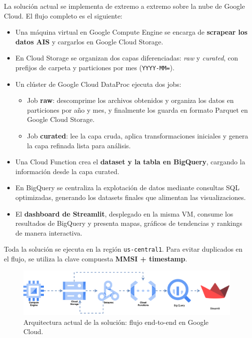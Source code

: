 \documentclass[10pt]{article}
\begin{document}
La solución actual se implementa de extremo a extremo sobre la nube de Google Cloud. El flujo completo es el siguiente:

\begin{itemize}
    \item Una máquina virtual en Google Compute Engine se encarga de \textbf{scrapear los datos AIS} y cargarlos en Google Cloud Storage. 
    \item En Cloud Storage se organizan dos capas diferenciadas: \textit{raw} y \textit{curated}, con prefijos de carpeta y particiones por mes (\texttt{YYYY-MM=}).
    \item Un clúster de Google Cloud DataProc ejecuta dos jobs:
    \begin{itemize}
        \item Job \textbf{raw}: descomprime los archivos obtenidos y organiza los datos en particiones por año y mes, y finalmente los guarda en formato Parquet en Google Cloud Storage.
        \item Job \textbf{curated}: lee la capa cruda, aplica transformaciones iniciales y genera la capa refinada lista para análisis.
    \end{itemize}
    \item Una Cloud Function crea el \textbf{dataset y la tabla en BigQuery}, cargando la información desde la capa curated.
    \item En BigQuery se centraliza la explotación de datos mediante consultas SQL optimizadas, generando los datasets finales que alimentan las visualizaciones.
    \item El \textbf{dashboard de Streamlit}, desplegado en la misma VM, consume los resultados de BigQuery y presenta mapas, gráficos de tendencias y rankings de manera interactiva.
\end{itemize}

Toda la solución se ejecuta en la región \texttt{us-central1}. Para evitar duplicados en el flujo, se utiliza la clave compuesta \textbf{MMSI + timestamp}.
\vspace{0.5cm}
\begin{figure}[H]
    \centering
    \includegraphics[width=\textwidth]{figures/arch/ArchitectureDiagram.png}
    \caption{Arquitectura actual de la solución: flujo end-to-end en Google Cloud.}
\end{figure}
\vspace{0.1cm}
\end{document}
